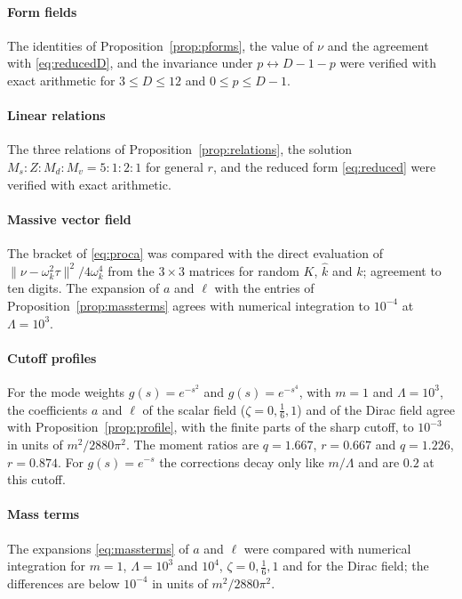 \documentclass[11pt,a4paper]{article}
\theoremstyle{stmt}
\theoremstyle{defn}
\theoremstyle{rmk}
\numberwithin{equation}{section}
\begin{document}
\paragraph{Form fields} The identities of Proposition~\ref{prop:pforms}, the value of $\nu$ and the agreement with \eqref{eq:reducedD}, and the invariance under $p\leftrightarrow D-1-p$ were verified with exact arithmetic for $3\le D\le12$ and $0\le p\le D-1$.

\paragraph{Linear relations} The three relations of Proposition~\ref{prop:relations}, the solution $M_s:Z:M_d:M_v=5:1:2:1$ for general $r$, and the reduced form \eqref{eq:reduced} were verified with exact arithmetic.

\paragraph{Massive vector field} The bracket of \eqref{eq:proca} was compared with the direct evaluation of $\|\nu-\omega_k^2\tau\|^2/4\omega_k^4$ from the $3\times3$ matrices for random $K$, $\hat k$ and $k$; agreement to ten digits. The expansion of $a$ and $\ell$ with the entries of Proposition~\ref{prop:massterms} agrees with numerical integration to $10^{-4}$ at $\Lambda=10^3$.

\paragraph{Cutoff profiles} For the mode weights $g(s)=e^{-s^2}$ and $g(s)=e^{-s^4}$, with $m=1$ and $\Lambda=10^3$, the coefficients $a$ and $\ell$ of the scalar field ($\zeta=0,\tfrac16,1$) and of the Dirac field agree with Proposition~\ref{prop:profile}, with the finite parts of the sharp cutoff, to $10^{-3}$ in units of $m^2/2880\pi^2$. The moment ratios are $q=1.667$, $r=0.667$ and $q=1.226$, $r=0.874$. For $g(s)=e^{-s}$ the corrections decay only like $m/\Lambda$ and are $0.2$ at this cutoff.

\paragraph{Mass terms} The expansions \eqref{eq:massterms} of $a$ and $\ell$ were compared with numerical integration for $m=1$, $\Lambda=10^3$ and $10^4$, $\zeta=0,\tfrac16,1$ and for the Dirac field; the differences are below $10^{-4}$ in units of $m^2/2880\pi^2$.
\end{document}
